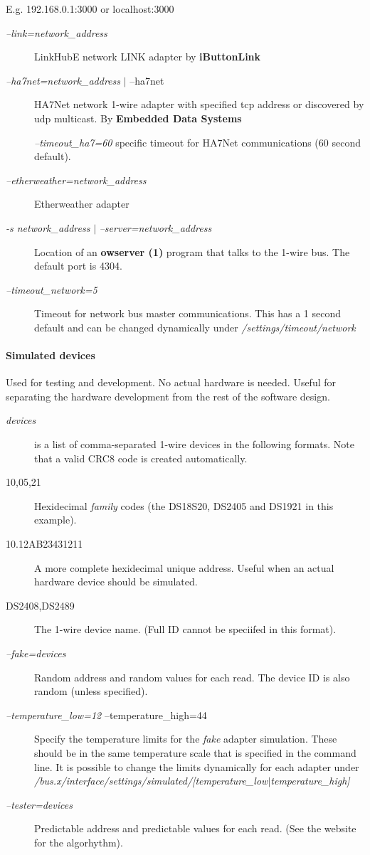 E.g. 192.168.0.1:3000
or localhost:3000 \begin{description}
\item [\textit{--link=network\_address} ] LinkHubE network LINK adapter by
 \textbf{iButtonLink} 
\item [\textit{--ha7net=network\_address} $|$ --ha7net ] HA7Net network 1-wire adapter
with specified tcp address or discovered by udp multicast. By \textbf{Embedded Data
Systems} 

\textit{--timeout\_ha7=60} specific timeout for HA7Net communications (60 second default).

\item [\textit{--etherweather=network\_address} ] Etherweather adapter 
\item [\textit{-s network\_address} $|$ \textit{--server=network\_address
}] Location of an \textsf{\textbf{owserver (1)}} program that talks to the 1-wire bus. The default
port is 4304. 
\item [\textit{--timeout\_network=5} ] Timeout for network bus master communications.
This has a 1 second default and can be changed dynamically under \textit{/settings/timeout/network}

\end{description}

\paragraph*{ Simulated devices}
Used for testing and development. No actual hardware
is needed. Useful for separating the hardware development from the rest
of the software design. \begin{description}
\item [\textit{devices} ] is a list of comma-separated 1-wire devices
in the following formats. Note that a valid CRC8 code is created automatically.

\item [10,05,21 ] Hexidecimal \textit{family} codes (the DS18S20, DS2405 and DS1921 in this
example). 
\item [10.12AB23431211 ] A more complete hexidecimal unique address. Useful
when an actual hardware device should be simulated. 
\item [DS2408,DS2489 ] The 1-wire
device name. (Full ID cannot be speciifed in this format). 
\item [\textit{--fake=devices} ] Random
address and random values for each read. The device ID is also random (unless
specified). 
\item [\textit{--temperature\_low=12} --temperature\_high=44 ] Specify the temperature
limits for the \textit{fake} adapter simulation. These should be in the same temperature
scale that is specified in the command line. It is possible to change the
limits dynamically for each adapter under \textit{/bus.x/interface/settings/simulated/[temperature\_low$|$temperature\_high]}

\item [\textit{--tester=devices} ] Predictable address and predictable values for each read.
(See the website for the algorhythm). 
\end{description}

